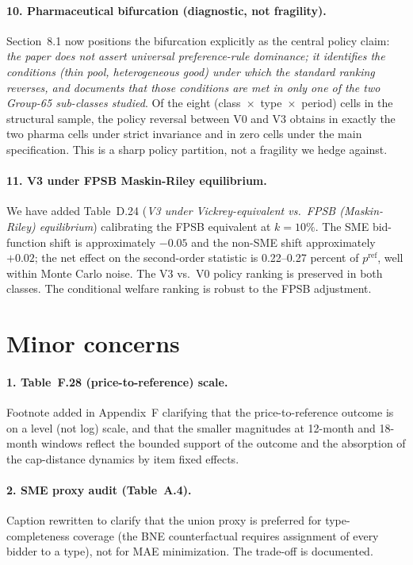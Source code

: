 \documentclass[11pt]{article}
\begin{document}
\paragraph{10. Pharmaceutical bifurcation (diagnostic, not fragility).}
Section~8.1 now positions the bifurcation explicitly as the central policy claim: \emph{the paper does not assert universal preference-rule dominance; it identifies the conditions (thin pool, heterogeneous good) under which the standard ranking reverses, and documents that those conditions are met in only one of the two Group-65 sub-classes studied}. Of the eight (class~$\times$~type~$\times$~period) cells in the structural sample, the policy reversal between V0 and V3 obtains in exactly the two pharma cells under strict invariance and in zero cells under the main specification. This is a sharp policy partition, not a fragility we hedge against.

\paragraph{11. V3 under FPSB Maskin-Riley equilibrium.}
We have added Table~D.24 (\emph{V3 under Vickrey-equivalent vs.\ FPSB (Maskin-Riley) equilibrium}) calibrating the FPSB equivalent at $k=10\%$. The SME bid-function shift is approximately $-0.05$ and the non-SME shift approximately $+0.02$; the net effect on the second-order statistic is 0.22--0.27 percent of $p^{\mathrm{ref}}$, well within Monte Carlo noise. The V3 vs.\ V0 policy ranking is preserved in both classes. The conditional welfare ranking is robust to the FPSB adjustment.

\section*{Minor concerns}

\paragraph{1. Table~F.28 (price-to-reference) scale.}
Footnote added in Appendix~F clarifying that the price-to-reference outcome is on a level (not log) scale, and that the smaller magnitudes at 12-month and 18-month windows reflect the bounded support of the outcome and the absorption of the cap-distance dynamics by item fixed effects.

\paragraph{2. SME proxy audit (Table~A.4).}
Caption rewritten to clarify that the union proxy is preferred for type-completeness coverage (the BNE counterfactual requires assignment of every bidder to a type), not for MAE minimization. The trade-off is documented.
\end{document}
